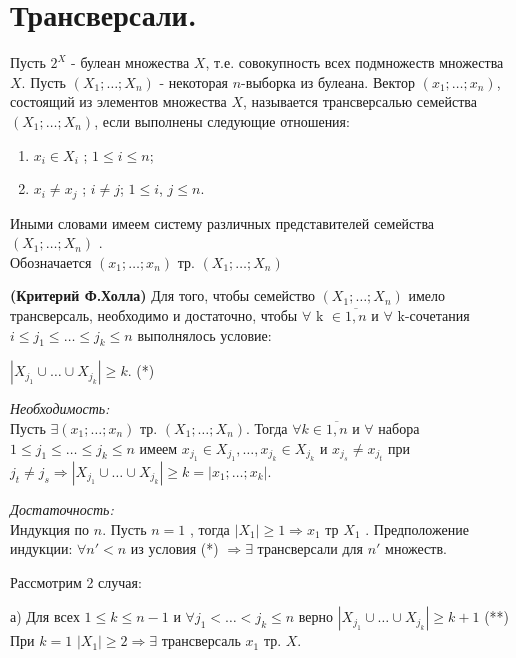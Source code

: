 \section{Трансверсали.}

\opri Пусть $2^{X}$ - булеан множества $X$, т.е. совокупность всех подмножеств множества $X$. Пусть $(X_1; \dots; X_n)$ - некоторая $n$-выборка из булеана. Вектор $(x_1; \dots; x_n)$, состоящий из элементов множества $X$, называется трансверсалью семейства $(X_1; \dots; X_n)$, если выполнены следующие отношения:

\begin{enumerate}
\item $x_i \in X_i$ ; $1 \leq i \leq n$;
\item $x_i \neq x_j$ ; $i \neq j$; $1 \leq i$, $j \leq n$.
\end{enumerate}

Иными словами имеем систему различных представителей семейства $(X_1; \dots; X_n)$ .\\
Обозначается $(x_1; \dots; x_n)$ тр. $(X_1; \dots; X_n)$

\thr \textbf{(Критерий Ф.Холла)}
Для того, чтобы семейство $(X_1; \dots; X_n)$ имело трансверсаль, необходимо и достаточно, чтобы $\forall$ k $\in \overline{1,n}$ и $\forall$ k-сочетания $i \leq j_1 \leq \dots \leq j_k \leq n$ выполнялось условие:

\begin{center}
$|X_{j_1} \cup \dots \cup X_{j_k}|\geq k$. (*)
\end{center}

\proof

\emph{Необходимость:}\\
Пусть $\exists (x_1; \dots; x_n)$ тр. $(X_1; \dots; X_n)$. Тогда $\forall k \in \overline{1,n}$ и $\forall$ набора $1 \leq j_1 \leq \dots \leq j_k\leq n$ имеем $x_{j_1} \in X_{j_1}, \dots, x_{j_k} \in X_{j_k}$ и $x_{j_s} \neq x_{j_t}$ при $j_t \neq j_s \Rightarrow |X_{j_1} \cup \dots \cup X_{j_k}| \geq k = |{x_1; \dots; x_k}|$.

\emph{Достаточность:}\\
Индукция по $n$. Пусть $n=1$ , тогда
$|X_1| \geq 1 \Rightarrow {x_1}$ тр $X_1$ .
Предположение индукции: $\forall n' < n$ из условия (*) $\Rightarrow \exists$ трансверсали для $n'$ множеств. 

Рассмотрим 2 случая:

а) Для всех $1 \leq k \leq n-1$ и $\forall j_1 < \dots < j_k \leq n$ верно $|X_{j_1} \cup \dots \cup X_{j_k}| \geq k+1$ (**)
При $k=1$ $|X_1| \geq 2 \Rightarrow \exists$ трансверсаль $x_1$ тр. $X$.

